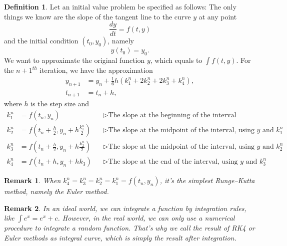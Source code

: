 \documentclass[a4paper]{article}
\theoremstyle{definition}
\newtheorem{definition}{Definition}
\theoremstyle{plain}
\newtheorem{remark}{Remark}
\begin{document}
\begin{definition}

Let an initial value problem be specified as follows:
The only things we know are the slope of the tangent line to the curve $y$ at any point
\begin{equation*}
    \frac{dy}{dt}=f(t,y)
\end{equation*}
and the initial condition $(t_0,y_0)$, namely
\begin{equation*}
    y(t_0)=y_0.
\end{equation*}
We want to approximate the original function $y$, which equals to $\int f(t,y)$. For the $n+1^{th}$ iteration, we have the approximation
\begin{align*}
    y_{n+1}&=y_n+\frac{1}{6}h(k^n_1+2k^n_2+2k^n_3+k^n_4),\\
    t_{n+1}&=t_n+h,
\end{align*}
where $h$ is the step size and 
\begin{align*}
    k^n_1&=f(t_n,y_n)&&\triangleright \text{The slope at the beginning of the interval}\\
    k^n_2&=f\left(t_n+\frac{h}{2},y_n+h\frac{k^n_1}{2}\right)&&\triangleright \text{The slope at the midpoint of the interval, using $y$ and $k^n_1$}\\
    k^n_3&=f\left(t_n+\frac{h}{2},y_n+h\frac{k^n_2}{2}\right)&&\triangleright \text{The slope at the midpoint of the interval, using $y$ and $k^n_2$}\\
    k^n_4&=f(t_n+h,y_n+hk_3)&&\triangleright \text{The slope at the end of the interval, using $y$ and $k^n_3$}
\end{align*}
\end{definition}

\begin{remark}
When $k^n_4=k^n_3=k^n_2=k^n_1=f(t_n,y_n)$, it's the simplest Runge–Kutta method, namely the Euler method.
\end{remark}

\begin{remark}
In an ideal world, we can integrate a function by integration rules, like $\int e^x=e^x+c$. However, in the real world, we can only use a numerical procedure to integrate a random function. That's why we call the result of RK4 or Euler methods as integral curve, which is simply the result after integration.
\end{remark}
\end{document}
